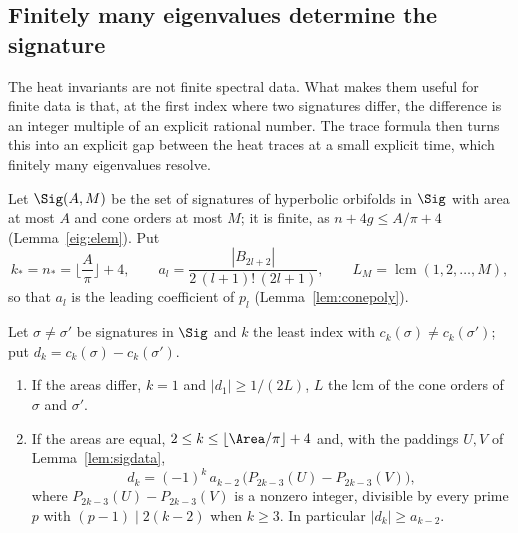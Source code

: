 
\subsection{Finitely many eigenvalues determine the signature}\label{sec:eig-E}

The heat invariants are not finite spectral data. What makes them useful for finite data is that, at the first index where two signatures differ, the difference is an integer multiple of an explicit rational number. The trace formula then turns this into an explicit gap between the heat traces at a small explicit time, which finitely many eigenvalues resolve.

Let $\Sig(A,M)$ be the set of signatures of hyperbolic orbifolds in $\Sig$ with area at most $A$ and cone orders at most $M$; it is finite, as $n+4g\le A/\pi+4$ (Lemma~\ref{eig:elem}). Put
\[
  k_*=n_*=\Big\lfloor\frac A\pi\Big\rfloor+4,\qquad a_l=\frac{|B_{2l+2}|}{2\,(l+1)!\,(2l+1)},\qquad L_M=\operatorname{lcm}(1,2,\dots,M),
\]
so that $a_l$ is the leading coefficient of $p_l$ (Lemma~\ref{lem:conepoly}).

\begin{lemma}\label{eig:int}
Let $\sigma\ne\sigma'$ be signatures in $\Sig$ and $k$ the least index with $c_k(\sigma)\ne c_k(\sigma')$; put $d_k=c_k(\sigma)-c_k(\sigma')$.
\begin{enumerate}[label=(\roman*)]
\item If the areas differ, $k=1$ and $|d_1|\ge1/(2L)$, $L$ the lcm of the cone orders of $\sigma$ and $\sigma'$.
\item If the areas are equal, $2\le k\le\lfloor\Area/\pi\rfloor+4$ and, with the paddings $U,V$ of Lemma~\ref{lem:sigdata},
\[
  d_k=(-1)^k\,a_{k-2}\,\big(P_{2k-3}(U)-P_{2k-3}(V)\big),
\]
where $P_{2k-3}(U)-P_{2k-3}(V)$ is a nonzero integer, divisible by every prime $p$ with $(p-1)\mid2(k-2)$ when $k\ge3$. In particular $|d_k|\ge a_{k-2}$.
\end{enumerate}
\end{lemma}

